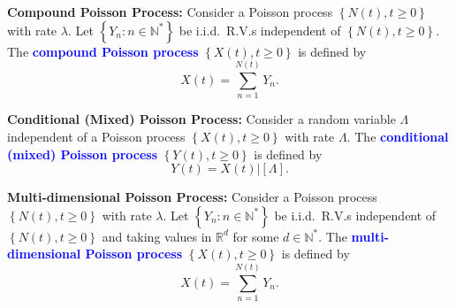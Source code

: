 \textbf{Compound Poisson Process:} Consider a Poisson process $\left\{N\left( t \right) ,t\ge 0 \right\} $ with rate $\lambda$. Let $\left\{ Y_n:n\in \mathbb{N}^{*} \right\} $ be i.i.d.\ R.V.s independent of $\left\{N\left( t \right) ,t\ge 0 \right\} $. The \textbf{\textcolor{Blue}{compound Poisson process}} $\left\{ X\left( t \right) ,t\ge 0 \right\} $ is defined by
\[X\left( t \right) =\sum_{n=1}^{N\left( t \right) } Y_n.\]

\textbf{Conditional (Mixed) Poisson Process:} Consider a random variable $\Lambda$ independent of a Poisson process $\left\{ X\left( t \right) ,t\ge 0 \right\} $ with rate $\Lambda$. The \textbf{\textcolor{Blue}{conditional (mixed) Poisson process}} $\left\{ Y\left( t \right) ,t\ge 0 \right\} $ is defined by
\[Y\left( t \right) =X\left( t \right) |\left[ \Lambda \right] .\]

\textbf{Multi-dimensional Poisson Process:} Consider a Poisson process $\left\{ N\left( t \right) ,t\ge 0 \right\} $ with rate $\lambda$. Let $\left\{ Y_n:n\in \mathbb{N}^{*} \right\} $ be i.i.d.\ R.V.s independent of $\left\{ N\left( t \right) ,t\ge 0 \right\} $ and taking values in $\mathbb{R}^{d}$ for some $d\in \mathbb{N}^{*}$. The \textbf{\textcolor{Blue}{multi-dimensional Poisson process}} $\left\{ X\left( t \right) ,t\ge 0 \right\} $ is defined by
\[X\left( t \right) =\sum_{n=1}^{N\left( t \right) } Y_n.\]
